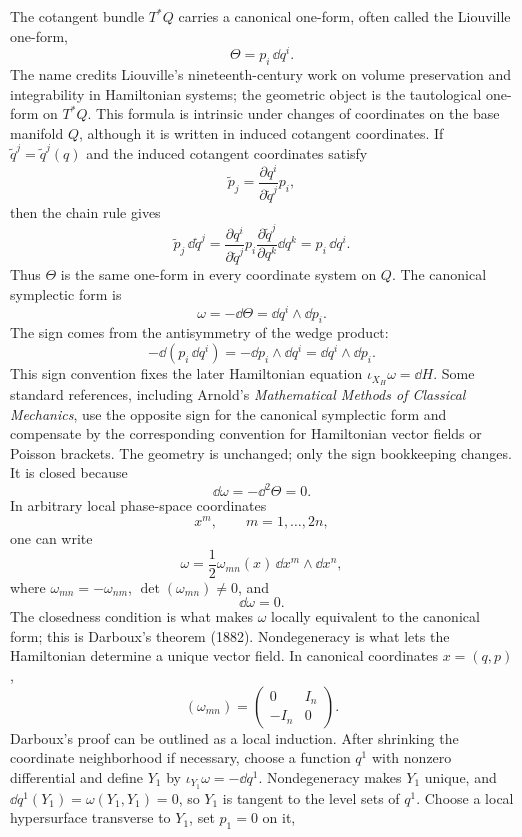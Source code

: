 The cotangent bundle \(T^*Q\) carries a canonical one-form, often called the
Liouville one-form,
\[
  \Theta=p_i\,\dd q^i.
\]
The name credits Liouville's nineteenth-century work on volume preservation and
integrability in Hamiltonian systems; the geometric object is the tautological
one-form on \(T^*Q\).
This formula is intrinsic under changes of coordinates on the base manifold
\(Q\), although it is written in induced cotangent coordinates. If
\(\tilde q^j=\tilde q^j(q)\) and the induced cotangent coordinates satisfy
\[
  \tilde p_j=\frac{\partial q^i}{\partial\tilde q^j}p_i,
\]
then the chain rule gives
\[
  \tilde p_j\,\dd\tilde q^j
  =
  \frac{\partial q^i}{\partial\tilde q^j}p_i
  \frac{\partial\tilde q^j}{\partial q^k}\dd q^k
  =
  p_i\,\dd q^i.
\]
Thus \(\Theta\) is the same one-form in every coordinate system on \(Q\).
The canonical symplectic form is
\[
  \omega=-\dd\Theta=\dd q^i\wedge\dd p_i.
\]
The sign comes from the antisymmetry of the wedge product:
\[
  -\dd(p_i\,\dd q^i)
  =
  -\dd p_i\wedge\dd q^i
  =
  \dd q^i\wedge\dd p_i.
\]
This sign convention fixes the later Hamiltonian equation
\(\iota_{X_H}\omega=\dd H\). Some standard references, including Arnold's
\emph{Mathematical Methods of Classical Mechanics}, use the opposite sign for
the canonical symplectic form and compensate by the corresponding convention
for Hamiltonian vector fields or Poisson brackets. The geometry is unchanged;
only the sign bookkeeping changes.
It is closed because
\[
  \dd\omega=-\dd^2\Theta=0.
\]
In arbitrary local phase-space coordinates
\[
  x^m,\qquad m=1,\ldots,2n,
\]
one can write
\[
  \omega=\frac12\omega_{mn}(x)\,\dd x^m\wedge\dd x^n,
\]
where \(\omega_{mn}=-\omega_{nm}\), \(\det(\omega_{mn})\neq0\), and
\[
  \dd\omega=0.
\]
The closedness condition is what makes \(\omega\) locally equivalent to the
canonical form; this is Darboux's theorem (1882). Nondegeneracy is what lets
the Hamiltonian determine a unique vector field. In canonical coordinates
\(x=(q,p)\),
\[
  (\omega_{mn})=
  \begin{pmatrix}
  0 & I_n\\
  -I_n & 0
  \end{pmatrix}.
\]
Darboux's proof can be outlined as a local induction. After shrinking the
coordinate neighborhood if necessary, choose a function \(q^1\) with nonzero
differential and define \(Y_1\) by
\(\iota_{Y_1}\omega=-\dd q^1\). Nondegeneracy makes \(Y_1\) unique, and
\(\dd q^1(Y_1)=\omega(Y_1,Y_1)=0\), so \(Y_1\) is tangent to the level sets of
\(q^1\). Choose a local hypersurface transverse to \(Y_1\), set \(p_1=0\) on it,
